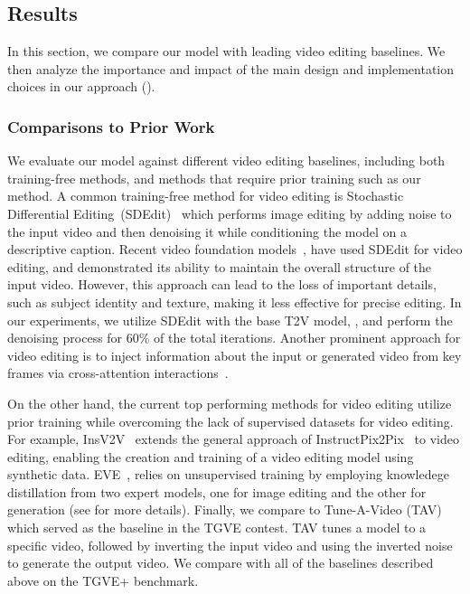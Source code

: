 \subsection{Results}
In this section, we compare our model with leading video editing baselines.
We then analyze the importance and impact of the main design and implementation choices in our approach ().


\subsubsection{Comparisons to Prior Work}
\label{edit:eval}
We evaluate our model against different video editing baselines, including both training-free methods, and methods that require prior training such as our method.
A common training-free method for video editing is Stochastic Differential Editing~(SDEdit)~\citep{meng2021sdedit} which performs image editing by adding noise to the input video and then denoising it while conditioning the model on a descriptive caption.
Recent video foundation models~\citep{BarTal2024LumiereAS,videoworldsimulators2024}, have used SDEdit for video editing, and demonstrated its ability to maintain the overall structure of the input video.
However, this approach can lead to the loss of important details, such as subject identity and texture, making it less effective for precise editing.
In our experiments, we utilize SDEdit with the base T2V model, \OursVideo, and perform the denoising process for 60\% of the total iterations.
Another prominent approach for video editing is to inject information about the input or generated video from key frames via cross-attention interactions~\citep{Wu2023FairyFP,yatim2023space}.

On the other hand, the current top performing methods for video editing utilize prior training while overcoming the lack of supervised datasets for video editing.
For example, InsV2V~\citep{Cheng2023ConsistentVT} extends the general approach of InstructPix2Pix~\citep{brooks2022instructpix2pix} to video editing, enabling the creation and training of a video editing model using synthetic data.
EVE~\citep{EVE}, relies on unsupervised training by employing knowledege distillation from two expert models, one for image editing and the other for \textToV generation (see  for more details).
Finally, we compare to Tune-A-Video (TAV)~\citep{wu2023tune} which served as the baseline in the TGVE contest.
TAV tunes a \textToI model to a specific video, followed by inverting the input video and using the inverted noise to generate the output video.
We compare with all of the baselines described above on the TGVE+ benchmark.

